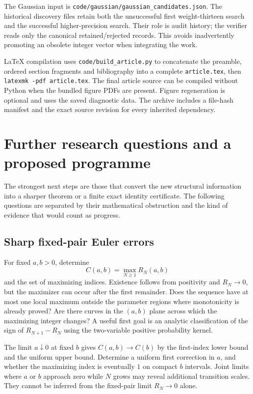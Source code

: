 \documentclass[11pt,letterpaper]{article}
\theoremstyle{definition}
\theoremstyle{remark}
\newcommand{\code}[1]{\nolinkurl{#1}}
\begin{document}
The Gaussian input is \code{code/gaussian/gaussian_candidates.json}.
The historical discovery files retain both the unsuccessful first
weight-thirteen search and the successful higher-precision search.
Their role is audit history; the verifier reads only the canonical
retained/rejected records. This avoids inadvertently promoting an obsolete
integer vector when integrating the work.

LaTeX compilation uses \code{code/build_article.py} to concatenate the
preamble, ordered section fragments and bibliography into a complete
\code{article.tex}, then \code{latexmk -pdf article.tex}. The final
article source can be compiled without Python when the bundled figure
PDFs are present. Figure regeneration is optional and uses the saved
diagnostic data. The archive includes a file-hash manifest and the exact
source revision for every inherited dependency.

\FloatBarrier

\section{Further research questions and a proposed programme}
\label{sec:agenda}

The strongest next steps are those that convert the new structural
information into a sharper theorem or a finite exact identity
certificate. The following questions are separated by their mathematical
obstruction and the kind of evidence that would count as progress.

\subsection{Sharp fixed-pair Euler errors}

For fixed $a,b>0$, determine
\[
 C(a,b)=\max_{N\ge1}R_N(a,b)
\]
and the set of maximizing indices. Existence follows from positivity and
$R_N\to0$, but the maximizer can occur after the first remainder.
Does the sequence have at most one local maximum outside the parameter
regions where monotonicity is already proved? Are there curves in the
$(a,b)$ plane across which the maximizing integer changes? A useful
first goal is an analytic classification of the sign of $R_{N+1}-R_N$
using the two-variable positive probability kernel.

The limit $a\downarrow0$ at fixed $b$ gives $C(a,b)\to C(b)$ by the
first-index lower bound and the uniform upper bound. Determine
a uniform first correction in $a$, and whether the maximizing index is
eventually $1$ on compact $b$ intervals. Joint limits where $a$ or $b$
approach zero while $N$ grows may reveal additional transition scales.
They cannot be inferred from the fixed-pair limit $R_N\to0$ alone.
\end{document}
